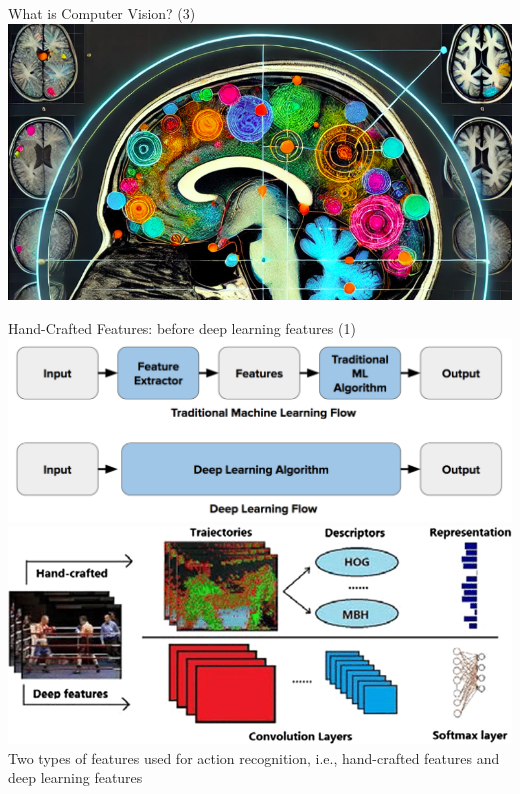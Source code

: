 \documentclass[serif, aspectratio=169]{beamer}
\begin{document}
	\begin{frame}{What is Computer Vision? (3)}
		\centering
		\includegraphics[keepaspectratio, scale=0.7]{pic/medical.png}		
	\end{frame}
	\begin{frame}{Hand-Crafted Features: before deep learning features (1)}
		\centering
		\includegraphics[keepaspectratio, scale=0.44]{pic/handcrafted_features.png}\\
		\includegraphics[keepaspectratio, scale=0.27]{pic/Two-types-of-features-used-for-action-recognition-ie-hand-crafted-features-and-deep.png}
		\\ \small {Two types of features used for action recognition, i.e., hand-crafted features and deep learning features
		}
	\end{frame}
\end{document}
